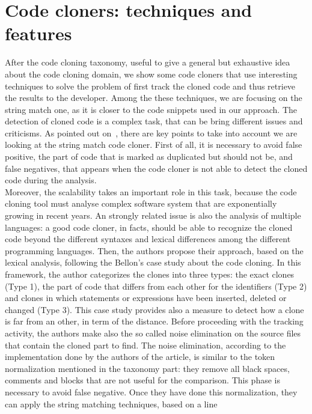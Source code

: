 \section{Code cloners: techniques and features}
After the code cloning taxonomy, useful to give a general but exhaustive idea 
about the code cloning domain, we show some code cloners that use interesting 
techniques to solve the problem of first track the cloned code and thus 
retrieve the results to the developer. Among the these techniques, we are 
focusing on the string match one, as it is closer to the code snippets used in 
our approach. The detection of cloned code is a complex task, that can be bring 
different issues and criticisms. As pointed out 
on~\cite{stephane_ducasse_effectiveness_2005}, there are key points to take 
into account we are looking at the string match code cloner. First of all, it 
is necessary to avoid false positive, the part of code that is marked as 
duplicated but should not be, and false negatives, that appears when the code 
cloner is not able to detect the cloned code during the analysis. \\
Moreover, the scalability takes an important role in this task, because the 
code cloning tool must analyse complex software system that are exponentially 
growing in recent years. An strongly related issue is also the analysis of 
multiple languages: a good code cloner, in facts, should be able to recognize 
the cloned code beyond the different syntaxes and lexical differences among the 
different programming languages. Then, the authors propose their approach, 
based on the lexical analysis, following the Bellon's case study about the code 
cloning. In this framework, the author categorizes the clones into three types: 
the exact clones (Type 1), the part of code that differs from each other for 
the identifiers (Type 2) and clones in which statements or expressions have 
been inserted, deleted or changed (Type 3). This case study provides also a 
measure to detect how a clone is far from an other, in term of the distance. 
Before proceeding with the tracking activity, the authors make also the so 
called noise elimination on the source files that contain the cloned part to 
find. The noise elimination, according to the implementation done by the 
authors of the article, is similar to the token normalization mentioned in the 
taxonomy part: they remove all black spaces, comments and blocks that are not 
useful for the comparison.
This phase is necessary to avoid false negative. Once they have done this 
normalization, they can apply the string matching techniques, based on a line 
